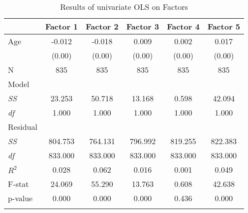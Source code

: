 \begin{table}[htbp]
  \raggedright
  \caption{Results of univariate OLS on Factors}
    \begin{tabular}{lccccc}
    \toprule
          & Factor 1 & Factor 2 & Factor 3 & Factor 4 & Factor 5 \\
    \midrule
    Age   & -0.012\sym{***} & -0.018\sym{***} & 0.009\sym{***} & 0.002 & 0.017\sym{***} \\
          & (0.00) & (0.00) & (0.00) & (0.00) & (0.00) \\
    \midrule
    N     & 835   & 835   & 835   & 835   & 835 \\
    Model &       &       &       &       &  \\
    \hspace*{0.1cm} \textit{SS} & 23.253 & 50.718 & 13.168 & 0.598 & 42.094 \\
    \hspace*{0.1cm} \textit{df} & 1.000 & 1.000 & 1.000 & 1.000 & 1.000 \\
    Residual &       &       &       &       &  \\
    \hspace*{0.1cm} \textit{SS} & 804.753 & 764.131 & 796.992 & 819.255 & 822.383 \\
    \hspace*{0.1cm} \textit{df} & 833.000 & 833.000 & 833.000 & 833.000 & 833.000 \\
    $R^2$ & 0.028 & 0.062 & 0.016 & 0.001 & 0.049 \\
    F-stat & 24.069 & 55.290 & 13.763 & 0.608 & 42.638 \\
    p-value & 0.000 & 0.000 & 0.000 & 0.436 & 0.000 \\
    \bottomrule
	\Tablenote{6}{\sym{***}~~~~~~p<0.01. $\upbeta~/~(SE)$.} \\	
    \end{tabular}%
  \label{tab:stdfactor}%
\end{table}%
